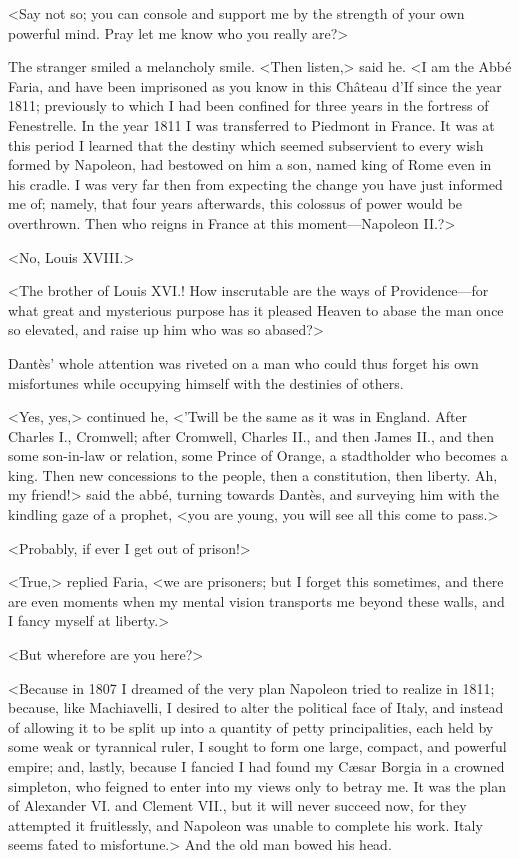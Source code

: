  <Say not so; you can console and support me by the strength of your own powerful mind. Pray let me know who you really are?> 

 The stranger smiled a melancholy smile. <Then listen,> said he. <I am the Abbé Faria, and have been imprisoned as you know in this Château d'If since the year 1811; previously to which I had been confined for three years in the fortress of Fenestrelle. In the year 1811 I was transferred to Piedmont in France. It was at this period I learned that the destiny which seemed subservient to every wish formed by Napoleon, had bestowed on him a son, named king of Rome even in his cradle. I was very far then from expecting the change you have just informed me of; namely, that four years afterwards, this colossus of power would be overthrown. Then who reigns in France at this moment—Napoleon II.?> 

 <No, Louis XVIII.> 

 <The brother of Louis XVI.! How inscrutable are the ways of Providence—for what great and mysterious purpose has it pleased Heaven to abase the man once so elevated, and raise up him who was so abased?> 

 Dantès' whole attention was riveted on a man who could thus forget his own misfortunes while occupying himself with the destinies of others. 

 <Yes, yes,> continued he, <'Twill be the same as it was in England. After Charles I., Cromwell; after Cromwell, Charles II., and then James II., and then some son-in-law or relation, some Prince of Orange, a stadtholder who becomes a king. Then new concessions to the people, then a constitution, then liberty. Ah, my friend!> said the abbé, turning towards Dantès, and surveying him with the kindling gaze of a prophet, <you are young, you will see all this come to pass.> 

 <Probably, if ever I get out of prison!> 

 <True,> replied Faria, <we are prisoners; but I forget this sometimes, and there are even moments when my mental vision transports me beyond these walls, and I fancy myself at liberty.> 

 <But wherefore are you here?> 

 <Because in 1807 I dreamed of the very plan Napoleon tried to realize in 1811; because, like Machiavelli, I desired to alter the political face of Italy, and instead of allowing it to be split up into a quantity of petty principalities, each held by some weak or tyrannical ruler, I sought to form one large, compact, and powerful empire; and, lastly, because I fancied I had found my Cæsar Borgia in a crowned simpleton, who feigned to enter into my views only to betray me. It was the plan of Alexander VI. and Clement VII., but it will never succeed now, for they attempted it fruitlessly, and Napoleon was unable to complete his work. Italy seems fated to misfortune.> And the old man bowed his head. 

